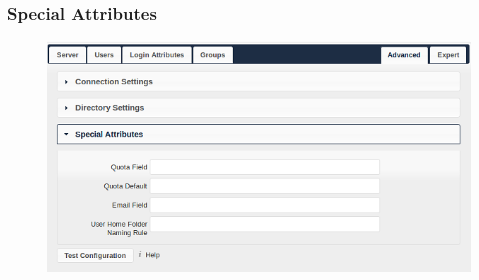 \documentclass[letterpaper,10pt,english]{sphinxmanual}
\begin{document}
\subsubsection{Special Attributes}
\label{configuration_user/user_auth_ldap:special-attributes}\begin{figure}[htbp]
\centering

\includegraphics{ldap-advanced-3-attributes.png}
\end{figure}
\end{document}
